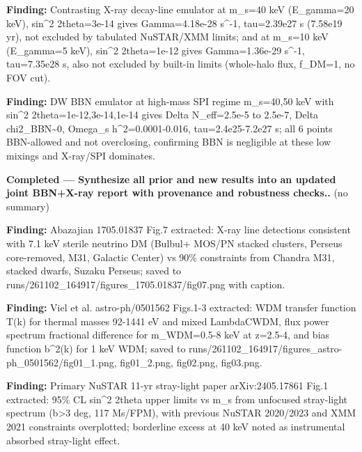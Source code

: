 \documentclass[11pt,a4paper]{article}
\begin{document}
\textbf{Finding:} Contrasting X-ray decay-line emulator at m\_s=40 keV (E\_gamma=20 keV), sin\textasciicircum{}2 2theta=3e-14 gives Gamma=4.18e-28 s\textasciicircum{}-1, tau=2.39e27 s (7.58e19 yr), not excluded by tabulated NuSTAR/XMM limits; and at m\_s=10 keV (E\_gamma=5 keV), sin\textasciicircum{}2 2theta=1e-12 gives Gamma=1.36e-29 s\textasciicircum{}-1, tau=7.35e28 s, also not excluded by built-in limits (whole-halo flux, f\_DM=1, no FOV cut).

\textbf{Finding:} DW BBN emulator at high-mass SPI regime m\_s=40,50 keV with sin\textasciicircum{}2 2theta=1e-12,3e-14,1e-14 gives Delta N\_eff=2.5e-5 to 2.5e-7, Delta chi2\_BBN\textasciitilde{}0, Omega\_s h\textasciicircum{}2=0.0001-0.016, tau=2.4e25-7.2e27 s; all 6 points BBN-allowed and not overclosing, confirming BBN is negligible at these low mixings and X-ray/SPI dominates.

\textbf{Completed --- Synthesize all prior and new results into an updated joint BBN+X-ray report with provenance and robustness checks..} (no summary)

\textbf{Finding:} Abazajian 1705.01837 Fig.7 extracted: X-ray line detections consistent with 7.1 keV sterile neutrino DM (Bulbul+ MOS/PN stacked clusters, Perseus core-removed, M31, Galactic Center) vs 90\% constraints from Chandra M31, stacked dwarfs, Suzaku Perseus; saved to runs/261102\_164917/figures\_1705.01837/fig07.png with caption.

\textbf{Finding:} Viel et al. astro-ph/0501562 Figs.1-3 extracted: WDM transfer function T(k) for thermal masses 92-1441 eV and mixed LambdaCWDM, flux power spectrum fractional difference for m\_WDM=0.5-8 keV at z=2.5-4, and bias function b\textasciicircum{}2(k) for 1 keV WDM; saved to runs/261102\_164917/figures\_astro-ph\_0501562/fig01\_1.png, fig01\_2.png, fig02.png, fig03.png.

\textbf{Finding:} Primary NuSTAR 11-yr stray-light paper arXiv:2405.17861 Fig.1 extracted: 95\% CL sin\textasciicircum{}2 2theta upper limits vs m\_s from unfocused stray-light spectrum (\textbar{}b\textbar{}\textgreater{}3 deg, 117 Ms/FPM), with previous NuSTAR 2020/2023 and XMM 2021 constraints overplotted; borderline excess at 40 keV noted as instrumental absorbed stray-light effect.
\end{document}
